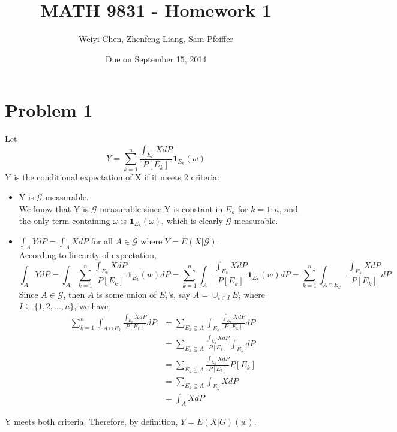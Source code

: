 \documentclass{article}
\begin{document}
\title{MATH 9831 - Homework 1}
\author{Weiyi Chen, Zhenfeng Liang, Sam Pfeiffer}
\date{Due on September 15, 2014}
\maketitle

\section*{Problem 1}
	Let
	\begin{equation}
		Y = \sum_{k=1}^n \frac{\int_{E_k} XdP}{P[E_k]} \textbf{1}_{E_k}(w)
	\end{equation}
	Y is the conditional expectation of X if it meets 2 criteria:
	\begin{itemize}
		\item Y is $\mathcal{G}$-measurable. \\
		We know that Y is $\mathcal{G}$-measurable since Y is constant in $E_k$ for $k=1:n$, and the only term containing $\omega$ is $\textbf{1}_{E_k}(\omega)$, which is clearly $\mathcal{G}$-measurable.
		\item $\int_A YdP = \int_A XdP$ for all $A \in \mathcal{G}$ where $Y=E(X|\mathcal{G})$. \\
		According to linearity of expectation,
		\begin{equation}
			\int_A YdP = \int_A \sum_{k=1}^n \frac{\int_{E_k} XdP}{P[E_k]} \textbf{1}_{E_k}(w) dP = \sum_{k=1}^n \int_A \frac{\int_{E_k} XdP}{P[E_k]} \textbf{1}_{E_k}(w) dP = \sum_{k=1}^n \int_{A\cap E_k} \frac{\int_{E_k} XdP}{P[E_k]} dP
		\end{equation}
		Since $A \in \mathcal{G}$, then $A$ is some union of $E_i$'s, say $A = \cup_{i\in I} E_i$ where $I \subseteq \{1,2,...,n\}$, we have
		\begin{align}
			\sum_{k=1}^n \int_{A\cap E_k} \frac{\int_{E_k} XdP}{P[E_k]} dP &= \sum_{E_k \subseteq A} \int_{E_k} \frac{\int_{E_k} XdP}{P[E_k]} dP \\
			&= \sum_{E_k \subseteq A} \frac{\int_{E_k} XdP}{P[E_k]} \int_{E_k} dP \\
			&= \sum_{E_k \subseteq A} \frac{\int_{E_k} XdP}{P[E_k]} P[E_k] \\
			&= \sum_{E_k \subseteq A} \int_{E_k} XdP \\
			&= \int_A XdP
		\end{align}
	\end{itemize}
	Y meets both criteria. Therefore, by definition, $Y = E(X|G)(w)$.
\end{document}
